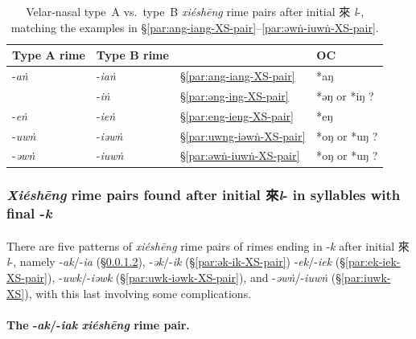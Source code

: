  \begin{table}[htbp]
    \centering
    \begin{tabular}{|l|l|l|l|}
    \hline
    \textbf{Type A rime} & \textbf{Type B rime} & & \textbf{OC} \\
    \hline
    -\textit{aṅ}  & -\textit{iaṅ}   & §\ref{par:ang-iang-XS-pair}  & *aŋ \\
    \color{gray}{-\textit{əṅ}} 
    
    & -\textit{iṅ}    & §\ref{par:əng-ing-XS-pair}   & *əŋ or *iŋ ? \\
    -\textit{eṅ}  & -\textit{ieṅ}   & §\ref{par:eng-ieng-XS-pair}  & *eŋ \\
    -\textit{uwṅ} & -\textit{iəwṅ}  & §\ref{par:uwng-iəwṅ-XS-pair} & *oŋ or *uŋ ? \\
    -\textit{əwṅ} & -\textit{iuwṅ}  & §\ref{par:əwṅ-iuwṅ-XS-pair}  & *oŋ or *uŋ ? \\
    \hline
    \end{tabular}
    \caption{Velar‐nasal type A vs.\ type B \textit{xiéshēng} rime pairs after initial 來 \textit{l}-,
    matching the examples in \S\ref{par:ang-iang-XS-pair}--\ref{par:əwṅ-iuwṅ-XS-pair}.}
    \label{tab:l-XS-rime-pairs-velar-nasal}
\end{table}


\subsubsection{\textit{Xiéshēng} rime pairs found after initial 來\textit{l}- in syllables with final -\textit{k}}
\label{subsubsec:xiesheng_l_k}

\paragraph{} 
 There are five patterns of \textit{xiéshēng} rime pairs of rimes ending in -\textit{k} after initial 來 \textit{l}-, namely -\textit{ak}/-\textit{ia} (§\ref{par:ak-iak-XS-pair}),  
-\textit{ək}/-\textit{ik} (§\ref{par:ək-ik-XS-pair})
 -\textit{ek}/-\textit{iek} 
(§\ref{par:ek-iek-XS-pair}), 
-\textit{uwk}/-\textit{iəwk}
(§\ref{par:uwk-iəwk-XS-pair}), and 
-\textit{əwṅ}/-\textit{iuwṅ} 
(§\ref{par:iuwk-XS}), with this last involving some complications. 


\paragraph{The -\textit{ak}/-\textit{iak} \textit{xiéshēng} rime pair.}
\label{par:ak-iak-XS-pair}

